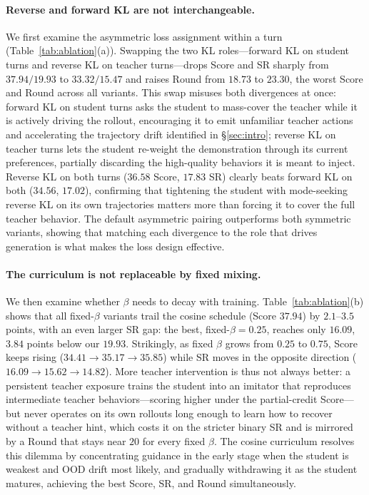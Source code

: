 \documentclass[11pt]{article}
\begin{document}
\paragraph{Reverse and forward KL are not interchangeable.}
We first examine the asymmetric loss assignment within a turn (Table~\ref{tab:ablation}(a)). Swapping the two KL roles---forward KL on student turns and reverse KL on teacher turns---drops Score and SR sharply from $37.94 / 19.93$ to $33.32 / 15.47$ and raises Round from $18.73$ to $23.30$, the worst Score and Round across all variants. This swap misuses both divergences at once: forward KL on student turns asks the student to mass-cover the teacher while it is actively driving the rollout, encouraging it to emit unfamiliar teacher actions and accelerating the trajectory drift identified in \S\ref{sec:intro}; reverse KL on teacher turns lets the student re-weight the demonstration through its current preferences, partially discarding the high-quality behaviors it is meant to inject. Reverse KL on both turns ($36.58$ Score, $17.83$ SR) clearly beats forward KL on both ($34.56$, $17.02$), confirming that tightening the student with mode-seeking reverse KL on its own trajectories matters more than forcing it to cover the full teacher behavior. The default asymmetric pairing outperforms both symmetric variants, showing that matching each divergence to the role that drives generation is what makes the loss design effective.

\paragraph{The curriculum is not replaceable by fixed mixing.}
We then examine whether $\beta$ needs to decay with training. Table~\ref{tab:ablation}(b) shows that all fixed-$\beta$ variants trail the cosine schedule (Score $37.94$) by $2.1$--$3.5$ points, with an even larger SR gap: the best, fixed-$\beta=0.25$, reaches only $16.09$, $3.84$ points below our $19.93$. Strikingly, as fixed $\beta$ grows from $0.25$ to $0.75$, Score keeps rising ($34.41 \to 35.17 \to 35.85$) while SR moves in the opposite direction ($16.09 \to 15.62 \to 14.82$). More teacher intervention is thus not always better: a persistent teacher exposure trains the student into an imitator that reproduces intermediate teacher behaviors---scoring higher under the partial-credit Score---but never operates on its own rollouts long enough to learn how to recover without a teacher hint, which costs it on the stricter binary SR and is mirrored by a Round that stays near $20$ for every fixed $\beta$. The cosine curriculum resolves this dilemma by concentrating guidance in the early stage when the student is weakest and OOD drift most likely, and gradually withdrawing it as the student matures, achieving the best Score, SR, and Round simultaneously.
\end{document}
